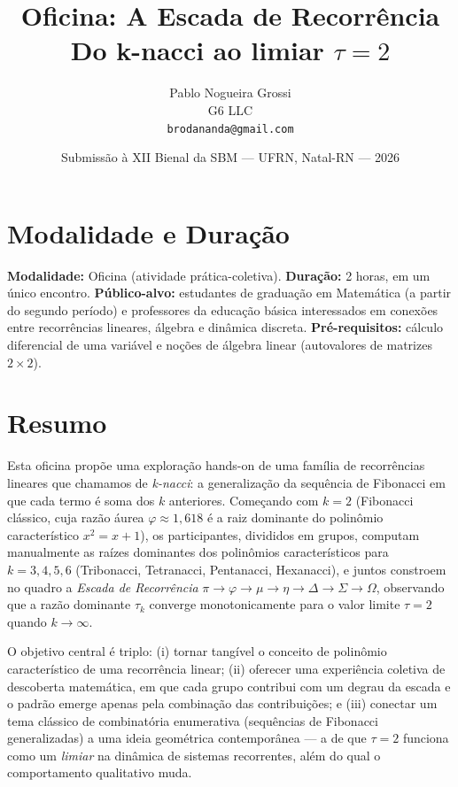 \documentclass[11pt,a4paper]{article}
\title{\textbf{Oficina: A Escada de Recorrência}\\[0.3em]
\large Do k-nacci ao limiar $\tau = 2$}
\author{Pablo Nogueira Grossi\\
\small G6 LLC\\
\small \texttt{brodananda@gmail.com}}
\date{Submissão à XII Bienal da SBM --- UFRN, Natal-RN --- 2026}
\begin{document}
\maketitle

\section*{Modalidade e Duração}
\noindent
\textbf{Modalidade:} Oficina (atividade prática-coletiva).\quad
\textbf{Duração:} 2 horas, em um único encontro.\quad
\textbf{Público-alvo:} estudantes de graduação em Matemática (a partir do segundo período) e professores da educação básica interessados em conexões entre recorrências lineares, álgebra e dinâmica discreta.\quad
\textbf{Pré-requisitos:} cálculo diferencial de uma variável e noções de álgebra linear (autovalores de matrizes $2\times 2$).

\section*{Resumo}

Esta oficina propõe uma exploração hands-on de uma família de recorrências lineares que chamamos de \emph{k-nacci}: a generalização da sequência de Fibonacci em que cada termo é soma dos $k$ anteriores. Começando com $k=2$ (Fibonacci clássico, cuja razão áurea $\varphi \approx 1{,}618$ é a raiz dominante do polinômio característico $x^2 = x + 1$), os participantes, divididos em grupos, computam manualmente as raízes dominantes dos polinômios característicos para $k = 3, 4, 5, 6$ (Tribonacci, Tetranacci, Pentanacci, Hexanacci), e juntos constroem no quadro a \emph{Escada de Recorrência} $\pi \to \varphi \to \mu \to \eta \to \Delta \to \Sigma \to \Omega$, observando que a razão dominante $\tau_k$ converge monotonicamente para o valor limite $\tau = 2$ quando $k \to \infty$.

O objetivo central é triplo: (i) tornar tangível o conceito de polinômio característico de uma recorrência linear; (ii) oferecer uma experiência coletiva de descoberta matemática, em que cada grupo contribui com um degrau da escada e o padrão emerge apenas pela combinação das contribuições; e (iii) conectar um tema clássico de combinatória enumerativa (sequências de Fibonacci generalizadas) a uma ideia geométrica contemporânea ---  a de que $\tau = 2$ funciona como um \emph{limiar} na dinâmica de sistemas recorrentes, além do qual o comportamento qualitativo muda.
\end{document}
